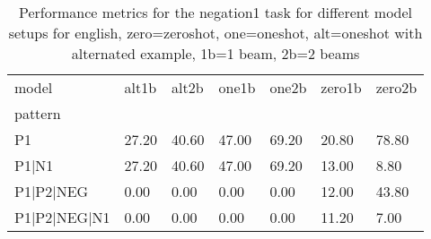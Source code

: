 \begin{table}[h]
\begin{tabular}{l|llllll}
\toprule
model & alt1b & alt2b & one1b & one2b & zero1b & zero2b \\
pattern &  &  &  &  &  &  \\
\midrule
P1 & 27.20 & 40.60 & 47.00 & 69.20 & 20.80 & 78.80 \\
P1|N1 & 27.20 & 40.60 & 47.00 & 69.20 & 13.00 & 8.80 \\
P1|P2|NEG & 0.00 & 0.00 & 0.00 & 0.00 & 12.00 & 43.80 \\
P1|P2|NEG|N1 & 0.00 & 0.00 & 0.00 & 0.00 & 11.20 & 7.00 \\
\bottomrule
\end{tabular}
\caption{Performance metrics for the negation1 task for different model setups for english, zero=zeroshot, one=oneshot, alt=oneshot with alternated example, 1b=1 beam, 2b=2 beams}
\label{tab:en_negation1_performance}
\end{table}
